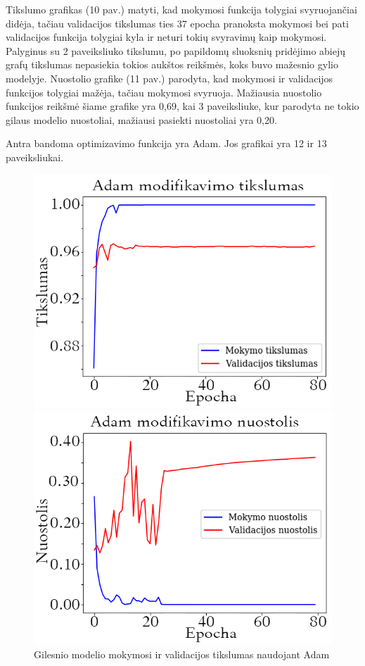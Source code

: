 \documentclass{VUMIFPSkursinis}
\begin{document}
Tikslumo grafikas (10 pav.) matyti, kad mokymosi funkcija tolygiai svyruojančiai didėja, tačiau validacijos tikslumas ties 37 epocha pranoksta mokymosi bei pati validacijos funkcija tolygiai kyla ir neturi 
tokių svyravimų kaip mokymosi. Palyginus su 2 paveiksliuko tikslumu, po papildomų sluoksnių pridėjimo abiejų grafų tikslumas nepasiekia tokios aukštos reikšmės, koks buvo mažesnio gylio modelyje.
Nuostolio grafike (11 pav.) parodyta, kad mokymosi ir validacijos funkcijos tolygiai mažėja, tačiau mokymosi svyruoja. Mažiausia nuostolio funkcijos reikšmė šiame grafike yra 0,69, kai 3 paveiksliuke, kur parodyta 
ne tokio gilaus modelio nuostoliai, mažiausi pasiekti nuostoliai yra 0,20.

Antra bandoma optimizavimo funkcija yra Adam. Jos grafikai yra 12 ir 13 paveiksliukai.

\begin{figure}[!htbp]
  \centering
  \begin{minipage}[b]{0.49\textwidth}
    \includegraphics[width=\textwidth]{img/AL/Adam_acc1.png}
    \caption{Gilesnio modelio mokymosi ir validacijos tikslumas naudojant Adam}
  \end{minipage}
  \begin{minipage}[b]{0.49\textwidth}
    \includegraphics[width=\textwidth]{img/AL/Adam_loss1.png}

\end{minipage}
\end{figure}
\end{document}
